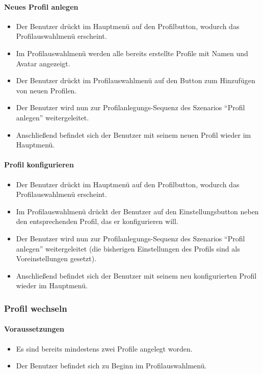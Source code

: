 \paragraph{Neues Profil anlegen}
\begin{itemize}
	\item Der Benutzer drückt im Hauptmenü auf den Profilbutton, wodurch das Profilauswahlmenü erscheint.
	\item Im Profilauswahlmenü werden alle bereits erstellte Profile mit Namen und Avatar angezeigt.
	\item Der Benutzer drückt im Profilauswahlmenü auf den Button zum Hinzufügen von neuen Profilen.
	\item Der Benutzer wird nun zur Profilanlegungs-Sequenz des Szenarios "`Profil anlegen"' weitergeleitet.
	\item Anschließend befindet sich der Benutzer mit seinem neuen Profil wieder im Hauptmenü.
\end{itemize}
\paragraph{Profil konfigurieren}
\begin{itemize}
	\item Der Benutzer drückt im Hauptmenü auf den Profilbutton, wodurch das Profilauswahlmenü erscheint. 
	\item Im Profilauswahlmenü drückt der Benutzer auf den Einstellungsbutton neben den entsprechenden Profil, das er konfigurieren will. 
	\item Der Benutzer wird nun zur Profilanlegungs-Sequenz des Szenarios "`Profil anlegen"' weitergeleitet (die bisherigen Einstellungen des Profils sind als Voreinstellungen gesetzt).
	\item Anschließend befindet sich der Benutzer mit seinem neu konfigurierten Profil wieder im Hauptmenü.
\end{itemize}

\subsubsection{Profil wechseln}
\paragraph{Voraussetzungen}
\begin{itemize}
	\item Es sind bereits mindestens zwei Profile angelegt worden.
	\item Der Benutzer befindet sich zu Beginn im Profilauswahlmenü.
\end{itemize}
